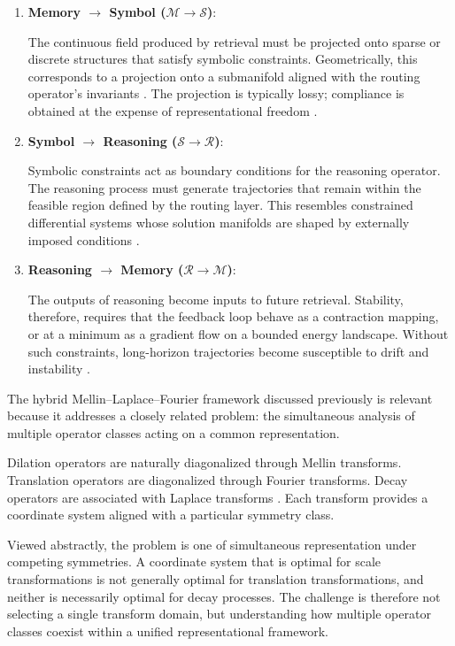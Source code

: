 \begin{enumerate}
\item \textbf{Memory $\rightarrow$ Symbol ($\mathcal{M}\rightarrow\mathcal{S}$)}:

The continuous field produced by retrieval must be projected onto sparse or discrete structures that satisfy symbolic constraints. Geometrically, this corresponds to a projection onto a submanifold aligned with the routing operator's invariants \cite{bronstein2021geometric}. The projection is typically lossy; compliance is obtained at the expense of representational freedom \cite{bengio2013representation}.

\item \textbf{Symbol $\rightarrow$ Reasoning ($\mathcal{S}\rightarrow\mathcal{R}$)}:

Symbolic constraints act as boundary conditions for the reasoning operator. The reasoning process must generate trajectories that remain within the feasible region defined by the routing layer. This resembles constrained differential systems whose solution manifolds are shaped by externally imposed conditions \cite{mallat2012group}.

\item \textbf{Reasoning $\rightarrow$ Memory ($\mathcal{R}\rightarrow\mathcal{M}$)}:

The outputs of reasoning become inputs to future retrieval. Stability, therefore, requires that the feedback loop behave as a contraction mapping, or at a minimum as a gradient flow on a bounded energy landscape. Without such constraints, long-horizon trajectories become susceptible to drift and instability \cite{khalil2002nonlinear}.

\end{enumerate}

The hybrid Mellin--Laplace--Fourier framework discussed previously \cite{irwin2026mlf} is relevant because it addresses a closely related problem: the simultaneous analysis of multiple operator classes acting on a common representation.

Dilation operators are naturally diagonalized through Mellin transforms. Translation operators are diagonalized through Fourier transforms. Decay operators are associated with Laplace transforms \cite{stein1971introduction,titchmarsh1948introduction}. Each transform provides a coordinate system aligned with a particular symmetry class.

Viewed abstractly, the problem is one of simultaneous representation under competing symmetries. A coordinate system that is optimal for scale transformations is not generally optimal for translation transformations, and neither is necessarily optimal for decay processes. The challenge is therefore not selecting a single transform domain, but understanding how multiple operator classes coexist within a unified representational framework.


